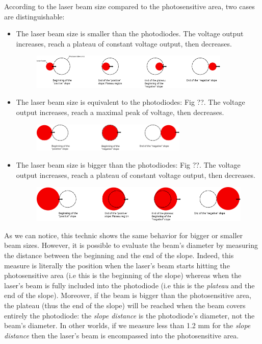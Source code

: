 \documentclass[11pt]{report}
\begin{document}
According to the laser beam size compared to the photosensitive area, two cases are distinguishable:
\begin{itemize}
	\item The laser beam size is smaller than the photodiodes. The voltage output increases, reach a plateau of constant voltage output, then decreases.
	\begin{figure}[h!]
	\centering
	\includegraphics[width=0.9\textwidth]{diode-size-sm}
	\label{fig:diode-size-sm}
	\end{figure}
	\item The laser beam size is equivalent to the photodiodes: Fig ??. The voltage output increases, reach a maximal peak of voltage, then decreases.
	\begin{figure}[h!]
	\centering
	\includegraphics[width=0.7\textwidth]{diode-size-eq}
	\label{fig:diode-size-eq}
	\end{figure}
	\item The laser beam size is bigger than the photodiodes: Fig ??. The voltage output increases, reach a plateau of constant voltage output, then decreases.
	\begin{figure}[h!]
	\centering
	\includegraphics[width=\textwidth]{diode-size-big}
	\label{fig:diode-size-big}
	\end{figure}
\end{itemize}
As we can notice, this technic shows the same behavior for bigger or smaller beam sizes. However, it is possible to evaluate the beam's diameter by measuring the distance between the beginning and the end of the slope. Indeed, this measure is literally the position when the laser's beam starts hitting the photosensitive area (i.e this is the beginning of the slope) whereas when the laser's beam is fully included into the photodiode (i.e this is the \textit{plateau} and the end of the slope). Moreover, if the beam is bigger than the photosensitive area, the plateau (thus the end of the slope) will be reached when the beam covers entirely the photodiode: the \textit{slope distance} is the photodiode's diameter, not the beam's diameter. In other worlds, if we measure less than 1.2 mm for the \textit{slope distance} then the laser's beam is encompassed into the photosensitive area.
\end{document}
